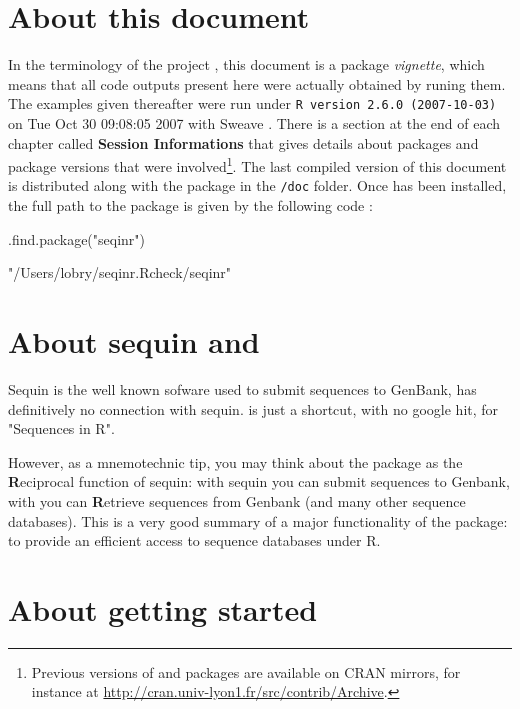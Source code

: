 \documentclass{article}
\begin{document}
\section{About this document}

In the terminology of the \Rlogo{} project \cite{R, RfromR}, this document 
is a package \emph{vignette}, which means that all code outputs present 
here were actually obtained by runing them.
The examples given thereafter were run under \texttt{R version 2.6.0 (2007-10-03)}
on Tue Oct 30 09:08:05 2007 with Sweave \cite{Sweave}. There is a section at the end of
each chapter called \textbf{Session Informations} that gives details about
packages and package versions that were involved\footnote{
Previous versions of \Rlogo{} and packages are available on CRAN mirrors,
for instance at \url{http://cran.univ-lyon1.fr/src/contrib/Archive}.
}.
The last compiled version of this document is distributed along with the \seqinr{}
package in the \texttt{/doc} folder. Once \seqinr{} has been installed, the
full path to the package is given by the following \Rlogo{} code :

\begin{Schunk}
\begin{Sinput}
 .find.package("seqinr")
\end{Sinput}
\begin{Soutput}
[1] "/Users/lobry/seqinr.Rcheck/seqinr"
\end{Soutput}
\end{Schunk}


\section{About sequin and \seqinr{}}

Sequin is the well known sofware used to submit sequences to GenBank, \seqinr{}
\cite{seqinr} has definitively no connection with sequin. \seqinr{} is just a shortcut, with
no google hit, for "Sequences in R".

However, as a mnemotechnic tip, you may think about the \seqinr{} package
as the {\bf{R}}eciprocal function of sequin: with sequin you can submit sequences
to Genbank, with \seqinr{} you can {\bf{R}}etrieve sequences from Genbank
(and many other sequence databases). This is
a very good summary of a major functionality of the \seqinr{} package: to
provide an efficient access to sequence databases under R.

\section{About getting started}
\end{document}
